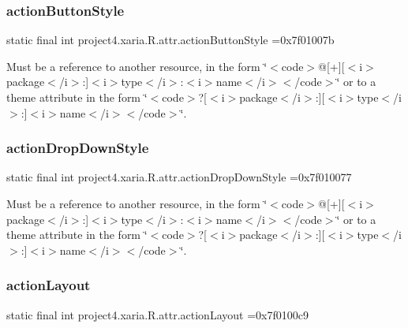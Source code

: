 \subsubsection{\texorpdfstring{action\+Button\+Style}{actionButtonStyle}}
{\footnotesize\ttfamily static final int project4.\+xaria.\+R.\+attr.\+action\+Button\+Style =0x7f01007b\hspace{0.3cm}{\ttfamily [static]}}

Must be a reference to another resource, in the form \char`\"{}$<$code$>$@\mbox{[}+\mbox{]}\mbox{[}$<$i$>$package$<$/i$>$\+:\mbox{]}$<$i$>$type$<$/i$>$\+:$<$i$>$name$<$/i$>$$<$/code$>$\char`\"{} or to a theme attribute in the form \char`\"{}$<$code$>$?\mbox{[}$<$i$>$package$<$/i$>$\+:\mbox{]}\mbox{[}$<$i$>$type$<$/i$>$\+:\mbox{]}$<$i$>$name$<$/i$>$$<$/code$>$\char`\"{}. \mbox{\label{classproject4_1_1xaria_1_1R_1_1attr_aef752dee5688113de68b26f74e585351}} 
\subsubsection{\texorpdfstring{action\+Drop\+Down\+Style}{actionDropDownStyle}}
{\footnotesize\ttfamily static final int project4.\+xaria.\+R.\+attr.\+action\+Drop\+Down\+Style =0x7f010077\hspace{0.3cm}{\ttfamily [static]}}

Must be a reference to another resource, in the form \char`\"{}$<$code$>$@\mbox{[}+\mbox{]}\mbox{[}$<$i$>$package$<$/i$>$\+:\mbox{]}$<$i$>$type$<$/i$>$\+:$<$i$>$name$<$/i$>$$<$/code$>$\char`\"{} or to a theme attribute in the form \char`\"{}$<$code$>$?\mbox{[}$<$i$>$package$<$/i$>$\+:\mbox{]}\mbox{[}$<$i$>$type$<$/i$>$\+:\mbox{]}$<$i$>$name$<$/i$>$$<$/code$>$\char`\"{}. \mbox{\label{classproject4_1_1xaria_1_1R_1_1attr_a8f9719d465fb5e9f5366f192ec3e884f}} 
\subsubsection{\texorpdfstring{action\+Layout}{actionLayout}}
{\footnotesize\ttfamily static final int project4.\+xaria.\+R.\+attr.\+action\+Layout =0x7f0100c9\hspace{0.3cm}{\ttfamily [static]}}

